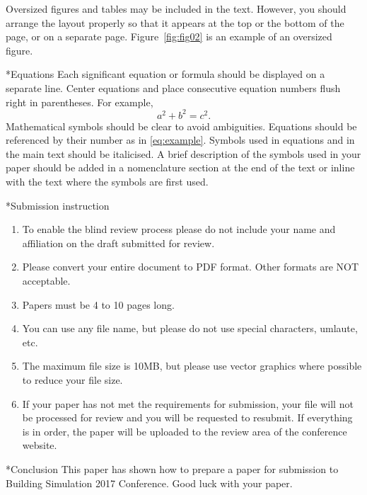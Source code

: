 \documentclass[twocolumn, a4paper,10pt]{article}
\makeatletter
\renewcommand\section{\@startsection{section}{1}{\z@}{0.25cm}{0.1cm}{\normalfont\large\bfseries}}
\renewcommand\subsection{\@startsection{subsection}{1}{\z@}{0.2cm}{0.1cm}{\normalfont\normalsize\bfseries}}
\makeatother
\begin{document}
Oversized figures and tables may be included in the text. However, you should arrange the layout properly so that it appears at the top or the bottom of the page, or on a separate page. Figure~\ref{fig:fig02} is an example of an oversized figure.

\subsection*{Equations}
Each significant equation or formula should be displayed on a separate line. Center equations and place consecutive equation numbers flush right in parentheses. For example,
\begin{equation}\label{eq:example}
  a^2+b^2=c^2.
\end{equation}
Mathematical symbols should be clear to avoid ambiguities. Equations should be referenced by their number as in \eqref{eq:example}.
Symbols used in equations and in the main text should be italicised.  A brief description of the symbols used in your paper should be added in a nomenclature section at the end of the text or inline with the text where
the symbols are first used.

\section*{Submission instruction}
\begin{enumerate}
    \item To enable the blind review process please do not
        include your name and affiliation on the draft
        submitted for review.
    \item Please convert your entire document to PDF format. Other formats are NOT acceptable.
    \item Papers must be 4 to 10 pages long.
    \item You can use any file name, but please do not use special characters, umlaute, etc.
    \item The maximum file size is 10MB, but please use vector graphics where possible to reduce your file size.
    \item If your paper has not met the requirements for submission, your file will not be processed for review and you will be requested to resubmit. If everything is in order, the paper will be uploaded to the review area of the conference website.
\end{enumerate}

\section*{Conclusion}
This paper has shown how to prepare a paper for submission to Building Simulation 2017 Conference. Good luck with your paper.
\end{document}
